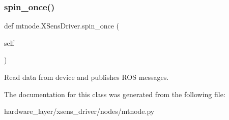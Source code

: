 \subsubsection{\texorpdfstring{spin\+\_\+once()}{spin\_once()}}
{\footnotesize\ttfamily def mtnode.\+X\+Sens\+Driver.\+spin\+\_\+once (\begin{DoxyParamCaption}\item[{}]{self }\end{DoxyParamCaption})}

\begin{DoxyVerb}Read data from device and publishes ROS messages.\end{DoxyVerb}
 

The documentation for this class was generated from the following file\+:\begin{DoxyCompactItemize}
\item 
hardware\+\_\+layer/xsens\+\_\+driver/nodes/mtnode.\+py\end{DoxyCompactItemize}
